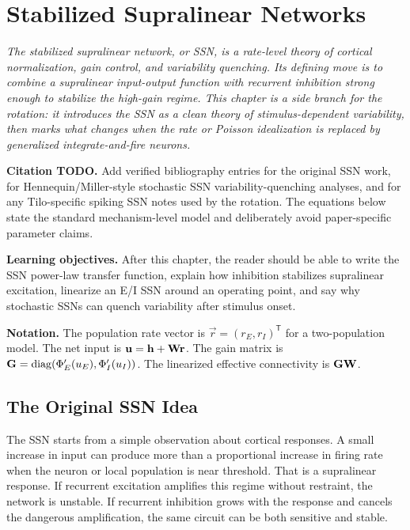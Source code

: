 \chapter{Stabilized Supralinear Networks}
\label{ch:stabilized-supralinear-networks}

\textit{The stabilized supralinear network, or SSN, is a rate-level theory of cortical normalization, gain control, and variability quenching. Its defining move is to combine a supralinear input-output function with recurrent inhibition strong enough to stabilize the high-gain regime. This chapter is a side branch for the rotation: it introduces the SSN as a clean theory of stimulus-dependent variability, then marks what changes when the rate or Poisson idealization is replaced by generalized integrate-and-fire neurons.}

\noindent\textbf{Citation TODO.} Add verified bibliography entries for the original SSN work, for Hennequin/Miller-style stochastic SSN variability-quenching analyses, and for any Tilo-specific spiking SSN notes used by the rotation. The equations below state the standard mechanism-level model and deliberately avoid paper-specific parameter claims.

\noindent\textbf{Learning objectives.} After this chapter, the reader should be able to write the SSN power-law transfer function, explain how inhibition stabilizes supralinear excitation, linearize an E/I SSN around an operating point, and say why stochastic SSNs can quench variability after stimulus onset.

\noindent\textbf{Notation.} The population rate vector is $\vec r=(r_E,r_I)^{\mathsf T}$ for a two-population model. The net input is $\mathbf{u}=\mathbf{h}+\mathbf{W}\mathbf{r}$. The gain matrix is $\mathbf{G}=\operatorname{diag}(\Phi'_E(u_E),\Phi'_I(u_I))$. The linearized effective connectivity is $\mathbf{G}\mathbf{W}$.

\section{The Original SSN Idea}
\label{sec:original-ssn-idea}

The SSN starts from a simple observation about cortical responses. A small increase in input can produce more than a proportional increase in firing rate when the neuron or local population is near threshold. That is a supralinear response. If recurrent excitation amplifies this regime without restraint, the network is unstable. If recurrent inhibition grows with the response and cancels the dangerous amplification, the same circuit can be both sensitive and stable.

